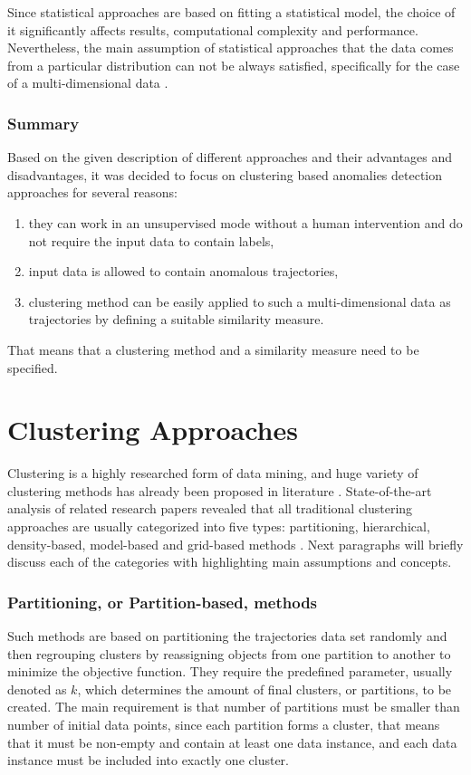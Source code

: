 Since statistical approaches are based on fitting a statistical model, the choice of it significantly affects results, computational complexity and performance. Nevertheless, the main assumption of statistical approaches that the data comes from a particular distribution can not be always satisfied, specifically for the case of a multi-dimensional data \cite{article:15_survey_ad}.

\subsubsection{Summary}
Based on the given description of different approaches and their advantages and disadvantages, it was decided to focus on clustering based anomalies detection approaches for several reasons: 
\begin{enumerate}[label=\arabic*)]
	\item they can work in an unsupervised mode without a human intervention and do not require the input data to contain labels,
	\item input data is allowed to contain anomalous trajectories,
	\item clustering method can be easily applied to such a multi-dimensional data as trajectories by defining a suitable similarity measure.
\end{enumerate}

That means that a clustering method and a similarity measure need to be specified.

\section{Clustering Approaches}
Clustering is a highly researched form of data mining, and huge variety of clustering methods has already been proposed in literature \cite{article:8_review_mot_cl_alg}. State-of-the-art analysis of related research papers revealed that all traditional clustering approaches are usually categorized into five types: partitioning, hierarchical, density-based, model-based and grid-based methods \cite{article:5_survey_tbsa}\cite{article:8_review_mot_cl_alg}. Next paragraphs will briefly discuss each of the categories with highlighting main assumptions and concepts.

\subsubsection{Partitioning, or Partition-based, methods}
Such methods are based on partitioning the trajectories data set randomly and then regrouping clusters by reassigning objects from one partition to another to minimize the objective function. They require the predefined parameter, usually denoted as $k$, which determines the amount of final clusters, or partitions, to be created. The main requirement is that number of partitions must be smaller than number of initial data points, since each partition forms a cluster, that means that it must be non-empty and contain at least one data instance, and each data instance must be included into exactly one cluster.

